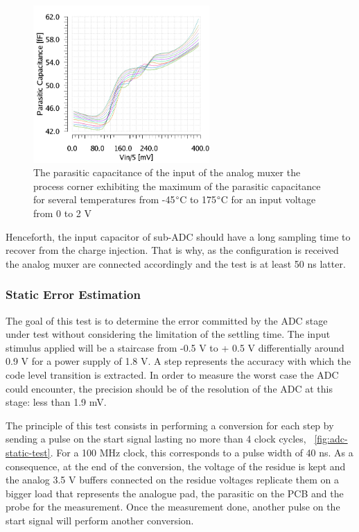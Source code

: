 \begin{figure}[htp]
    \centering
    \includegraphics[width=0.6\textwidth]{Chapter5/Figs/adc_chip/amux21-parasitic-ws-6s.png}
    \caption{The parasitic capacitance of the input of the analog muxer the process corner exhibiting the maximum of the parasitic capacitance for several temperatures from -45$\degree$C to 175$\degree$C for an input voltage from 0 to 2 V}
    \label{fig:adc-with-test}
\end{figure}

Henceforth, the input capacitor of sub-ADC should have a long sampling time to recover from the charge injection. That is why, as the configuration is received the analog muxer are connected accordingly and the test is at least 50 ns latter.

    \subsubsection{Static Error Estimation}
The goal of this test is to determine the error committed by the ADC stage under test without considering the limitation of the settling time. The input stimulus applied will be a staircase from -0.5 V to + 0.5 V differentially around 0.9 V for a power supply of 1.8 V. A step represents the accuracy with which the code level transition is extracted. In order to measure the worst case the ADC could encounter, the precision should be of the resolution of the ADC at this stage: less than 1.9 mV.

The principle of this test consists in performing a conversion for each step by sending a pulse on the start signal lasting no more than 4 clock cycles, \figurename~\ref{fig:adc-static-test}. For a 100 MHz clock, this corresponds to a pulse width of 40 ns. As a consequence, at the end of the conversion, the voltage of the residue is kept and the analog 3.5 V buffers connected on the residue voltages replicate them on a bigger load that represents the analogue pad, the parasitic on the PCB and the probe for the measurement. Once the measurement done, another pulse on the start signal will perform another conversion.


